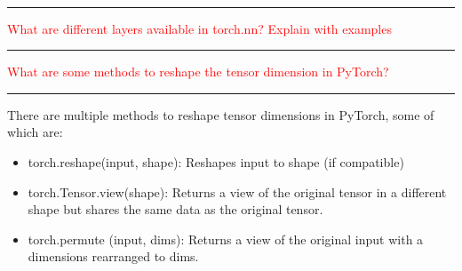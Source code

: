 \documentclass{article}
\begin{document}
\\

\noindent
{\color{red} \rule{\linewidth}{0.5mm}}
\textcolor{red}{What are different layers available in torch.nn? Explain with examples} \\
\noindent
%                      
\noindent
{\color{red} \rule{\linewidth}{0.5mm}}
\textcolor{red}{What are some methods to reshape the tensor dimension in PyTorch?} \\
\noindent
{\color{red} \rule{\linewidth}{0.5mm}}
There are multiple methods to reshape tensor dimensions in PyTorch, some of which are:
\begin{itemize}
    \item torch.reshape(input, shape): Reshapes input to shape (if compatible)
    \item torch.Tensor.view(shape): Returns a view of the original tensor in a different shape but shares the same data as the original tensor.
    \item torch.permute (input, dims): Returns a view of the original input with a dimensions rearranged to dims.
\end{itemize}
\end{document}
